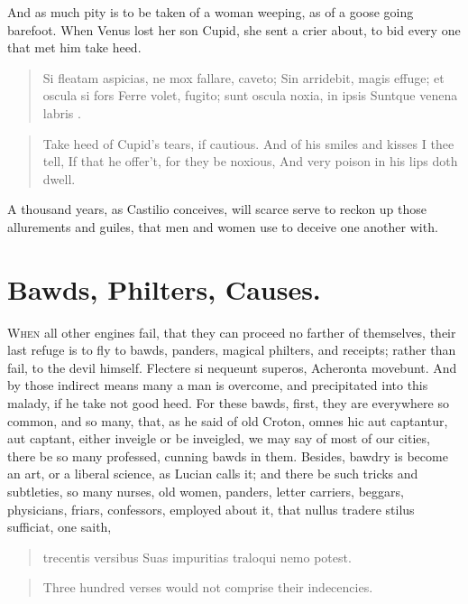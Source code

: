 And as much pity is to be taken of a woman weeping, as of a goose going
barefoot. When Venus lost her son Cupid, she sent a crier about, to bid
every one that met him take heed.

\begin{latin}
\begin{verse}
Si fleatam aspicias, ne mox fallare, caveto;
Sin arridebit, magis effuge; et oscula si fors
Ferre volet, fugito; sunt oscula noxia, in ipsis
Suntque venena labris \etc{}.
\end{verse}
\end{latin}
\translationrule%
\begin{verse}%
Take heed of Cupid's tears, if cautious.
And of his smiles and kisses I thee tell,
If that he offer't, for they be noxious,
And very poison in his lips doth dwell.
\end{verse}%

A thousand years, as Castilio conceives, will scarce serve to
reckon up those allurements and guiles, that men and women use to
deceive one another with.

\section{Bawds, Philters, Causes.}

\lettrine{W}{hen} all other engines fail, that they can proceed no farther of
themselves, their last refuge is to fly to bawds, panders, magical
philters, and receipts; rather than fail, to the devil himself.
Flectere si nequeunt superos, Acheronta movebunt. And by those indirect
means many a man is overcome, and precipitated into this malady, if he
take not good heed. For these bawds, first, they are everywhere so
common, and so many, that, as he said of old Croton, omnes hic
aut captantur, aut captant, either inveigle or be inveigled, we may say
of most of our cities, there be so many professed, cunning bawds in
them. Besides, bawdry is become an art, or a liberal science, as Lucian
calls it; and there be such tricks and subtleties, so many nurses, old
women, panders, letter carriers, beggars, physicians, friars,
confessors, employed about it, that nullus tradere stilus sufficiat,
one saith,

\begin{latin}
\begin{verse}
trecentis versibus
Suas impuritias traloqui nemo potest.
\end{verse}
\end{latin}
\translationrule%
\begin{verse}%
Three hundred verses would not comprise their indecencies.
\end{verse}%


